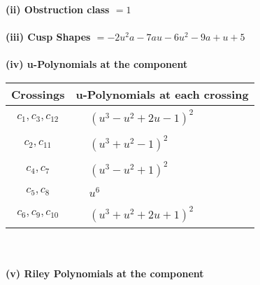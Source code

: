 \documentclass[1p]{elsarticle_modified}
\theoremstyle{definition}
\begin{document}
\flushleft \textbf{(ii) Obstruction class $= 1$}\\~\\
\flushleft \textbf{(iii) Cusp Shapes $= -2 u^2 a-7 a u-6 u^2-9 a+u+5$}\\~\\
\newpage\renewcommand{\arraystretch}{1}
\flushleft \textbf{(iv) u-Polynomials at the component}\newline \\
\begin{tabular}{m{50pt}|m{274pt}}
Crossings & \hspace{64pt}u-Polynomials at each crossing \\
\hline $$\begin{aligned}c_{1},c_{3},c_{12}\end{aligned}$$&$\begin{aligned}
&(u^3- u^2+2 u-1)^2
\end{aligned}$\\
\hline $$\begin{aligned}c_{2},c_{11}\end{aligned}$$&$\begin{aligned}
&(u^3+u^2-1)^2
\end{aligned}$\\
\hline $$\begin{aligned}c_{4},c_{7}\end{aligned}$$&$\begin{aligned}
&(u^3- u^2+1)^2
\end{aligned}$\\
\hline $$\begin{aligned}c_{5},c_{8}\end{aligned}$$&$\begin{aligned}
&u^6
\end{aligned}$\\
\hline $$\begin{aligned}c_{6},c_{9},c_{10}\end{aligned}$$&$\begin{aligned}
&(u^3+u^2+2 u+1)^2
\end{aligned}$\\
\hline
\end{tabular}\\~\\
\newpage\renewcommand{\arraystretch}{1}
\flushleft \textbf{(v) Riley Polynomials at the component}\newline \\
\end{document}
